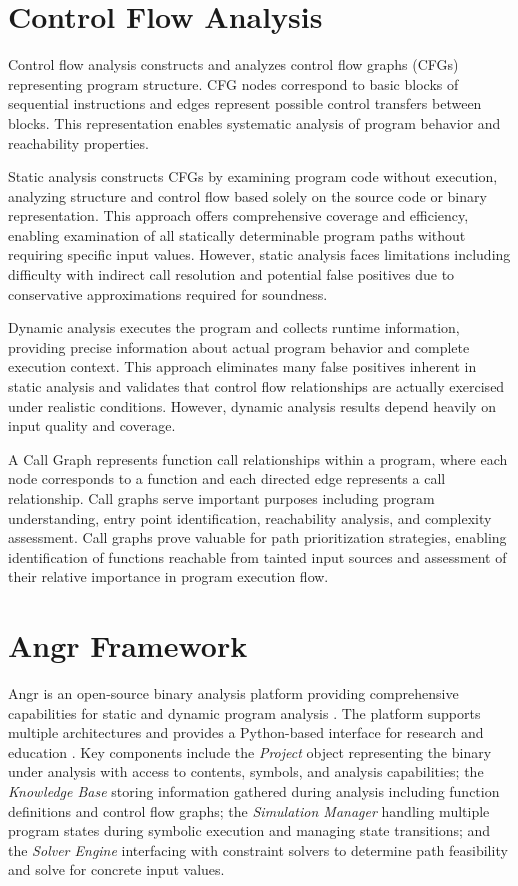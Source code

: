 \section{Control Flow Analysis}

Control flow analysis constructs and analyzes control flow graphs (CFGs) representing program structure. CFG nodes correspond to basic blocks of sequential instructions and edges represent possible control transfers between blocks. This representation enables systematic analysis of program behavior and reachability properties.

Static analysis constructs CFGs by examining program code without execution, analyzing structure and control flow based solely on the source code or binary representation. This approach offers comprehensive coverage and efficiency, enabling examination of all statically determinable program paths without requiring specific input values. However, static analysis faces limitations including difficulty with indirect call resolution and potential false positives due to conservative approximations required for soundness.

Dynamic analysis executes the program and collects runtime information, providing precise information about actual program behavior and complete execution context. This approach eliminates many false positives inherent in static analysis and validates that control flow relationships are actually exercised under realistic conditions. However, dynamic analysis results depend heavily on input quality and coverage.

A Call Graph represents function call relationships within a program, where each node corresponds to a function and each directed edge represents a call relationship. Call graphs serve important purposes including program understanding, entry point identification, reachability analysis, and complexity assessment. Call graphs prove valuable for path prioritization strategies, enabling identification of functions reachable from tainted input sources and assessment of their relative importance in program execution flow.

\section{Angr Framework}

Angr is an open-source binary analysis platform providing comprehensive capabilities for static and dynamic program analysis \cite{shoshitaishvili_sok_2016}. The platform supports multiple architectures and provides a Python-based interface for research and education \cite{springer_teaching_2018}. Key components include the \textit{Project} object representing the binary under analysis with access to contents, symbols, and analysis capabilities; the \textit{Knowledge Base} storing information gathered during analysis including function definitions and control flow graphs; the \textit{Simulation Manager} handling multiple program states during symbolic execution and managing state transitions; and the \textit{Solver Engine} interfacing with constraint solvers to determine path feasibility and solve for concrete input values.

